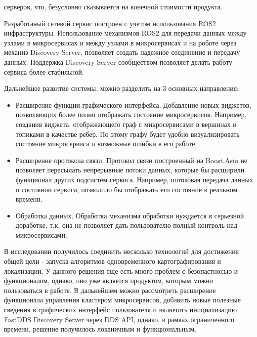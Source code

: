 \documentclass[a4paper, 14pt]{extreport}
\begin{document}
серверов, что, безусловно сказывается на конечной стоимости продукта.
\par Разработаный сетевой сервис построен с учетом использования ROS2 
инфраструктуры. Использование механизмов ROS2 для передачи данных между 
узлами в микросервисах и между узлами в микросервисах и на роботе через 
механиз Discovery Server, позволяет создать надежное соединение и передачу
данных. Поддержка Discovery Server сообществом позволяет делать работу 
сервиса более стабильной.
\par Дальнейшее развитие системы, можно разделить на 3 основных направления:
\begin{itemize}
        \item Расширение функции графического интерфейса. Добавление новых виджетов, позволяющих более полно отображать 
        состояние микросервисов. Например, создания виджета, отображающего граф с микросервисами в вершинах и 
        топиками в качестве ребер. По этому графу будет удобно визуализировать состояние микросервиса и возможные 
        ошибки в его работе.
        \item Расширение протокола связи. Протокол связи построенный на Boost.Asio не позволяет пересылать непрерывные 
        потоки данных, которые бы расширили функционал других подсистем сервиса. Например, потоковая передача данных 
        о состоянии сервиса, позволило бы отображать его состояние в реальном времени. 
        \item Обработка данных. Обработка механизма обработки нуждается в серьезной доработке, т.к. она не позволяет 
        дать пользователю полный контроль над микросервисами.        
\end{itemize}
В исследовании получилось соединить несколько 
технологий для достижения общей цели - запуска алгоритмов одновременного 
картографирования и локализации. У данного 
решения еще есть много проблем с безопастносью и функционалом, однако, 
оно уже является продуктом, которым можно 
пользоваться в работе. В дальнейшем можно рассмотреть расширение
 функционала управления кластером микросервисов,
добавить новые полезные сведения в графических интерфейс пользователя и 
включить инициализацию FastDDS Discovery Server
через DDS API, однако, в рамках ограниченного времени, решение получилось
 локаничным и функциональным.
\end{document}
